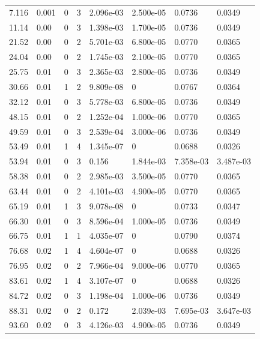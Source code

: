 \documentclass[preview]{standalone}
\begin{document}
{{\begin{tabular}{L{1.2cm}C{1.2cm} C{0.3cm}C{0.5cm} C{1.4cm}C{1.4cm} C{1.4cm}C{1.4cm}}
  7.116  &  0.001  & 0     &  3 &  2.096e-03  & 2.500e-05  & 0.0736 &  0.0349   \\ 
  11.14  &  0.00  & 0     &  3 &  1.398e-03  & 1.700e-05  & 0.0736 &  0.0349   \\ 
  21.52  &  0.00  & 0     &  2 &  5.701e-03  & 6.800e-05  & 0.0770 &  0.0365   \\ 
  24.04  &  0.00  & 0     &  2 &  1.745e-03  & 2.100e-05  & 0.0770 &  0.0365   \\ 
  25.75  &  0.01  & 0     &  3 &  2.365e-03  & 2.800e-05  & 0.0736 &  0.0349   \\ 
  30.66  &  0.01  & 1     &  2 &  9.809e-08  & 0  & 0.0767 &  0.0364   \\ 
  32.12  &  0.01  & 0     &  3 &  5.778e-03  & 6.800e-05  & 0.0736 &  0.0349   \\ 
  48.15  &  0.01  & 0     &  2 &  1.252e-04  & 1.000e-06  & 0.0770 &  0.0365   \\ 
  49.59  &  0.01  & 0     &  3 &  2.539e-04  & 3.000e-06  & 0.0736 &  0.0349   \\ 
  53.49  &  0.01  & 1     &  4 &  1.345e-07  & 0  & 0.0688 &  0.0326   \\ 
  53.94  &  0.01  & 0     &  3 &  0.156  & 1.844e-03  & 7.358e-03 &  3.487e-03   \\ 
  58.38  &  0.01  & 0     &  2 &  2.985e-03  & 3.500e-05  & 0.0770 &  0.0365   \\ 
  63.44  &  0.01  & 0     &  2 &  4.101e-03  & 4.900e-05  & 0.0770 &  0.0365   \\ 
  65.19  &  0.01  & 1     &  3 &  9.078e-08  & 0  & 0.0733 &  0.0347   \\ 
  66.30  &  0.01  & 0     &  3 &  8.596e-04  & 1.000e-05  & 0.0736 &  0.0349   \\ 
  66.75  &  0.01  & 1     &  1 &  4.035e-07  & 0  & 0.0790 &  0.0374   \\ 
  76.68  &  0.02  & 1     &  4 &  4.604e-07  & 0  & 0.0688 &  0.0326   \\ 
  76.95  &  0.02  & 0     &  2 &  7.966e-04  & 9.000e-06  & 0.0770 &  0.0365   \\ 
  83.61  &  0.02  & 1     &  4 &  3.107e-07  & 0  & 0.0688 &  0.0326   \\ 
  84.72  &  0.02  & 0     &  3 &  1.198e-04  & 1.000e-06  & 0.0736 &  0.0349   \\ 
  88.31  &  0.02  & 0     &  2 &  0.172  & 2.039e-03  & 7.695e-03 &  3.647e-03   \\ 
  93.60  &  0.02  & 0     &  3 &  4.126e-03  & 4.900e-05  & 0.0736 &  0.0349   \\ 

\end{tabular}}}
\end{document}
